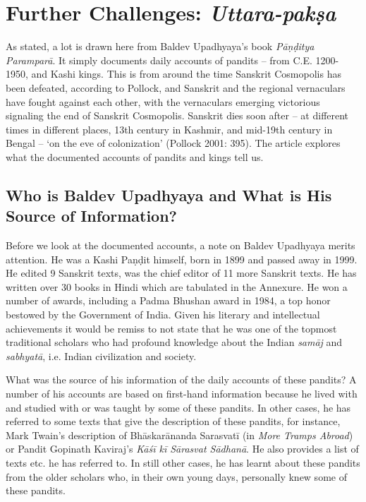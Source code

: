 \vspace{-.3cm}

\section*{Further Challenges: \textit{Uttara-pakṣa}}

As stated, a lot is drawn here from Baldev Upadhyaya’s book \textit{Pāṇḍitya Paramparā}. It simply documents daily accounts of pandits – from C.E. 1200-1950, and Kashi kings. This is from around the time Sanskrit Cosmopolis has been defeated, according to Pollock, and Sanskrit and the regional vernaculars have fought against each other, with the vernaculars emerging victorious signaling the end of Sanskrit Cosmopolis. Sanskrit dies soon after – at different times in different places, 13th century in Kashmir, and mid-19th century in Bengal – ‘on the eve of colonization’ (Pollock 2001: 395). The article explores what the documented accounts of pandits and kings tell us.

\vspace{-.3cm}

\subsection*{Who is Baldev Upadhyaya and \hfill\break What is His Source of Information?}

Before we look at the documented accounts, a note on Baldev Upadhyaya merits attention. He was a Kashi Paṇḍit himself, born in 1899 and passed away in 1999. He edited 9 Sanskrit texts, was the chief editor of 11 more Sanskrit texts. He has written over 30 books in Hindi which are tabulated in the Annexure. He won a number of awards, including a Padma Bhushan award in 1984, a top honor bestowed by the Government of India. Given his literary and intellectual achievements it would be remiss to not state that he was one of the topmost traditional scholars who had profound knowledge about the Indian \textit{samāj} and \textit{sabhyatā}, i.e. Indian civilization and society.

What was the source of his information of the daily accounts of these pandits? A number of his accounts are based on first-hand information because he lived with and studied with or was taught by some of these pandits. In other cases, he has referred to some texts that give the description of these pandits, for instance, Mark Twain’s description of Bhāskarānanda Sarasvatī (in \textit{More Tramps Abroad}) or Pandit Gopinath Kaviraj’s \textit{Kāśī kī Sārasvat Sādhanā}. He also provides a list of texts etc. he has referred to. In still other cases, he has learnt about these pandits from the older scholars who, in their own young days, personally knew some of these pandits.

